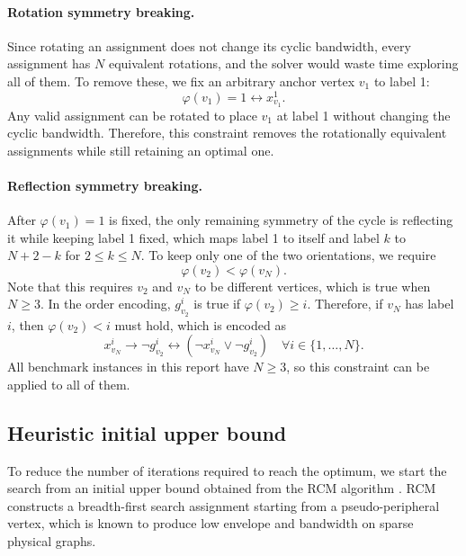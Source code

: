 \documentclass[a4paper,fleqn]{cas-sc}
\begin{document}
        \paragraph{\textbf{Rotation symmetry breaking.}}
        Since rotating an assignment does not change its cyclic bandwidth, every assignment has $N$ equivalent rotations, and the solver would waste time exploring all of them. To remove these, we fix an arbitrary anchor vertex $v_1$ to label 1:
        \begin{equation}
            \varphi(v_1) = 1 \leftrightarrow x_{v_1}^1.
            \label{eq:sb_rotation}
        \end{equation}
        Any valid assignment can be rotated to place $v_1$ at label 1 without changing the cyclic bandwidth. Therefore, this constraint removes the rotationally equivalent assignments while still retaining an optimal one.

        \paragraph{\textbf{Reflection symmetry breaking.}}
        After $\varphi(v_1)=1$ is fixed, the only remaining symmetry of the cycle is reflecting it while keeping label 1 fixed, which maps label 1 to itself and label $k$ to $N+2-k$ for $2 \le k \le N$. To keep only one of the two orientations, we require
        \begin{equation}
            \varphi(v_2) < \varphi(v_N).
            \label{eq:sb_reflection_math}
        \end{equation}
        Note that this requires $v_2$ and $v_N$ to be different vertices, which is true when $N \ge 3$. In the order encoding, $g_{v_2}^i$ is true if $\varphi(v_2) \ge i$. Therefore, if $v_N$ has label $i$, then $\varphi(v_2)<i$ must hold, which is encoded as
        \begin{equation}
            x_{v_N}^i \rightarrow \neg g_{v_2}^i
            \leftrightarrow (\neg x_{v_N}^i \vee \neg g_{v_2}^i)
            \quad \forall i \in \{1,\dots,N\}.
            \label{eq:sb_reflection_clauses}
        \end{equation}
        All benchmark instances in this report have $N \ge 3$, so this constraint can be applied to all of them.

    \subsection{Heuristic initial upper bound}
        To reduce the number of iterations required to reach the optimum, we start the search from an initial upper bound obtained from the RCM algorithm \citep{cuthill1969rcm}. RCM constructs a breadth-first search assignment starting from a pseudo-peripheral vertex, which is known to produce low envelope and bandwidth on sparse physical graphs.
\end{document}
